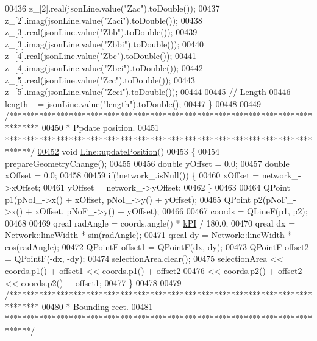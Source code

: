 \begin{DoxyCode}
00436   z\_[2].real(jsonLine.value(\textcolor{stringliteral}{"Zac"}).toDouble());
00437   z\_[2].imag(jsonLine.value(\textcolor{stringliteral}{"Zaci"}).toDouble());
00438   z\_[3].real(jsonLine.value(\textcolor{stringliteral}{"Zbb"}).toDouble());
00439   z\_[3].imag(jsonLine.value(\textcolor{stringliteral}{"Zbbi"}).toDouble());
00440   z\_[4].real(jsonLine.value(\textcolor{stringliteral}{"Zbc"}).toDouble());
00441   z\_[4].imag(jsonLine.value(\textcolor{stringliteral}{"Zbci"}).toDouble());
00442   z\_[5].real(jsonLine.value(\textcolor{stringliteral}{"Zcc"}).toDouble());
00443   z\_[5].imag(jsonLine.value(\textcolor{stringliteral}{"Zcci"}).toDouble());
00444 
00445   \textcolor{comment}{// Length}
00446   length\_ = jsonLine.value(\textcolor{stringliteral}{"length"}).toDouble();
00447 \}
00448 
00449 \textcolor{comment}{/*******************************************************************************}
00450 \textcolor{comment}{ * Ppdate position.}
00451 \textcolor{comment}{ ******************************************************************************/}
\hypertarget{line_8cpp_source_l00452}{}\hyperlink{group___models_ga8fdb12651d4bc592616d241386b066b3}{00452} \textcolor{keywordtype}{void} \hyperlink{group___models_ga8fdb12651d4bc592616d241386b066b3}{Line::updatePosition}()
00453 \{
00454   prepareGeometryChange();
00455 
00456   \textcolor{keywordtype}{double} yOffset = 0.0;
00457   \textcolor{keywordtype}{double} xOffset = 0.0;
00458 
00459   \textcolor{keywordflow}{if}(!network\_.isNull()) \{
00460     xOffset = network\_->xOffset;
00461     yOffset = network\_->yOffset;
00462   \}
00463 
00464   QPoint p1(pNoI\_->x() + xOffset, pNoI\_->y() + yOffset);
00465   QPoint p2(pNoF\_->x() + xOffset, pNoF\_->y() + yOffset);
00466 
00467   coords = QLineF(p1, p2);
00468 
00469   qreal radAngle = coords.angle() * \hyperlink{math__constants_8h_a368d99984512d9a6c6f18b37b4446431}{kPI} / 180.0;
00470   qreal dx = \hyperlink{group___models_ga3f810634c9908d62d33a1ab09a76c147}{Network::lineWidth} * sin(radAngle);
00471   qreal dy = \hyperlink{group___models_ga3f810634c9908d62d33a1ab09a76c147}{Network::lineWidth} * cos(radAngle);
00472   QPointF offset1 = QPointF(dx, dy);
00473   QPointF offset2 = QPointF(-dx, -dy);
00474   selectionArea.clear();
00475   selectionArea << coords.p1() + offset1 << coords.p1() + offset2
00476                 << coords.p2() + offset2 << coords.p2() + offset1;
00477 \}
00478 
00479 \textcolor{comment}{/*******************************************************************************}
00480 \textcolor{comment}{ * Bounding rect.}
00481 \textcolor{comment}{ ******************************************************************************/}

\end{DoxyCode}
